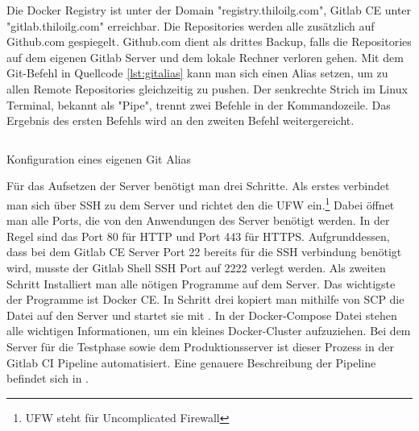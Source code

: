 Die Docker Registry ist unter der Domain "registry.thiloilg.com", Gitlab CE
unter "gitlab.thiloilg.com" erreichbar. Die Repositories werden alle zusätzlich
auf Github.com gespiegelt. Github.com dient als drittes Backup, falls die Repositories auf dem
eigenen Gitlab Server und dem lokale Rechner verloren gehen. Mit dem Git-Befehl in
Quellcode \ref{lst:gitalias} kann man sich einen Alias setzen, um zu allen Remote Repositories
gleichzeitig zu pushen. Der senkrechte Strich im Linux Terminal, bekannt als "Pipe", trennt zwei Befehle in der
Kommandozeile. Das Ergebnis des ersten Befehls wird an den zweiten Befehl weitergereicht.

\begin{listing}
    \inputminted{sh}{snippets/sh/pushall.sh}
    \caption{Konfiguration eines eigenen Git Alias}
    \label{lst:gitalias}
\end{listing}

Für das Aufsetzen der Server benötigt man drei Schritte.
Als erstes verbindet man sich über SSH zu dem Server und richtet den die UFW
ein.\footnote{UFW steht für Uncomplicated Firewall} Dabei öffnet man alle Ports,
die von den Anwendungen des Server benötigt werden. In der Regel sind das Port 80
für HTTP und Port 443 für HTTPS. Aufgrunddessen, dass bei dem Gitlab CE Server
Port 22 bereits für die SSH verbindung benötigt wird, musste der Gitlab Shell SSH
Port auf 2222 verlegt werden. Als zweiten Schritt Installiert man alle nötigen
Programme auf dem Server. Das wichtigste der Programme ist Docker CE. In Schritt
drei kopiert man mithilfe von SCP die  Datei auf den
Server und startet sie mit . In der Docker-Compose Datei
stehen alle wichtigen Informationen, um ein kleines Docker-Cluster aufzuziehen.
Bei dem Server für die Testphase sowie dem Produktionsserver ist dieser Prozess
in der Gitlab CI Pipeline automatisiert. Eine genauere Beschreibung der
Pipeline befindet sich in .

